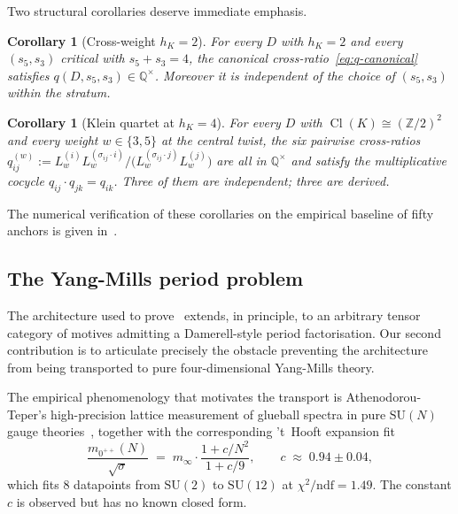 \documentclass[11pt]{amsart}
\newtheorem{corollary}[theorem]{Corollary}
\theoremstyle{definition}
\theoremstyle{remark}
\DeclareMathOperator{\Cl}{Cl}
\newcommand{\Q}{\mathbb{Q}}
\newcommand{\Z}{\mathbb{Z}}
\begin{document}
Two structural corollaries deserve immediate emphasis.

\begin{corollary}[Cross-weight $h_K = 2$]\label{cor:q-rational}
For every $D$ with $h_K = 2$ and every $(s_5, s_3)$ critical with
$s_5 + s_3 = 4$, the canonical cross-ratio~\eqref{eq:q-canonical}
satisfies $q(D, s_5, s_3) \in \Q^{\times}$. Moreover it is independent
of the choice of $(s_5, s_3)$ within the stratum.
\end{corollary}

\begin{corollary}[Klein quartet at $h_K = 4$]\label{cor:klein}
For every $D$ with $\Cl(K) \cong (\Z/2)^2$ and every weight $w \in
\{3,5\}$ at the central twist, the six pairwise cross-ratios
$q_{ij}^{(w)} := L_w^{(i)} L_w^{(\sigma_{ij} \cdot i)} /
\bigl(L_w^{(\sigma_{ij} \cdot j)} L_w^{(j)}\bigr)$ are all in
$\Q^{\times}$ and satisfy the multiplicative cocycle
$q_{ij} \cdot q_{jk} = q_{ik}$. Three of them are independent; three
are derived.
\end{corollary}

The numerical verification of these corollaries on the empirical
baseline of fifty anchors is given in~.

\subsection{The Yang-Mills period problem}
\label{ss:gap3-intro}
The architecture used to prove~ extends, in principle, to
an arbitrary tensor category of motives admitting a Damerell-style
period factorisation. Our second contribution is to articulate
precisely the obstacle preventing the architecture from being
transported to pure four-dimensional Yang-Mills theory.

The empirical phenomenology that motivates the transport is
Athenodorou-Teper's high-precision lattice measurement of glueball
spectra in pure $\mathrm{SU}(N)$ gauge theories~\cite{Athenodorou2021},
together with the corresponding 't~Hooft expansion fit~\cite{tHooft1974}
\begin{equation}\label{eq:F-N}
\frac{m_{0^{++}}(N)}{\sqrt{\sigma}} \; = \; m_\infty \cdot
\frac{1 + c/N^2}{1 + c/9}, \qquad c \; \approx \; 0.94 \pm 0.04,
\end{equation}
which fits 8 datapoints from $\mathrm{SU}(2)$ to $\mathrm{SU}(12)$ at
$\chi^2/\mathrm{ndf} = 1.49$. The constant $c$ is observed but has no
known closed form.
\end{document}
